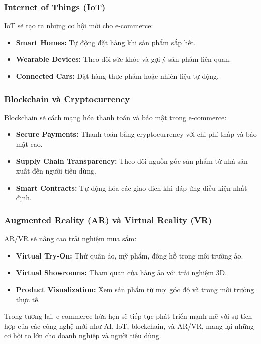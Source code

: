 \documentclass[a4paper,12pt]{report}
\begin{document}
\subsubsection{Internet of Things (IoT)}
IoT sẽ tạo ra những cơ hội mới cho e-commerce:
\begin{itemize}
    \item \textbf{Smart Homes:} Tự động đặt hàng khi sản phẩm sắp hết.
    \item \textbf{Wearable Devices:} Theo dõi sức khỏe và gợi ý sản phẩm liên quan.
    \item \textbf{Connected Cars:} Đặt hàng thực phẩm hoặc nhiên liệu tự động.
\end{itemize}

\subsubsection{Blockchain và Cryptocurrency}
Blockchain sẽ cách mạng hóa thanh toán và bảo mật trong e-commerce:
\begin{itemize}
    \item \textbf{Secure Payments:} Thanh toán bằng cryptocurrency với chi phí thấp và bảo mật cao.
    \item \textbf{Supply Chain Transparency:} Theo dõi nguồn gốc sản phẩm từ nhà sản xuất đến người tiêu dùng.
    \item \textbf{Smart Contracts:} Tự động hóa các giao dịch khi đáp ứng điều kiện nhất định.
\end{itemize}

\subsubsection{Augmented Reality (AR) và Virtual Reality (VR)}
AR/VR sẽ nâng cao trải nghiệm mua sắm:
\begin{itemize}
    \item \textbf{Virtual Try-On:} Thử quần áo, mỹ phẩm, đồng hồ trong môi trường ảo.
    \item \textbf{Virtual Showrooms:} Tham quan cửa hàng ảo với trải nghiệm 3D.
    \item \textbf{Product Visualization:} Xem sản phẩm từ mọi góc độ và trong môi trường thực tế.
\end{itemize}

Trong tương lai, e-commerce hứa hẹn sẽ tiếp tục phát triển mạnh mẽ với sự tích hợp của các công nghệ mới như AI, IoT, blockchain, và AR/VR, mang lại những cơ hội to lớn cho doanh nghiệp và người tiêu dùng.
\end{document}
